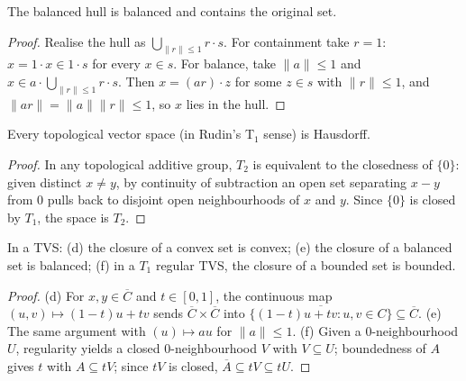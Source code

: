 \begin{theorem}
  \label{thm:balanced-hull-balanced}
  \leanok
  The balanced hull is balanced and contains the original set.
\end{theorem}
\begin{proof}
  \leanok
  Realise the hull as $\bigcup_{\|r\| \le 1} r \cdot s$. For containment
  take $r = 1$: $x = 1 \cdot x \in 1 \cdot s$ for every $x \in s$. For
  balance, take $\|a\| \le 1$ and $x \in a \cdot \bigcup_{\|r\|\le 1}
  r \cdot s$. Then $x = (a r) \cdot z$ for some $z \in s$ with
  $\|r\| \le 1$, and $\|a r\| = \|a\|\|r\| \le 1$, so $x$ lies in the
  hull.
\end{proof}

\begin{theorem}
  \label{thm:tvs-hausdorff}
  \leanok
  Every topological vector space (in Rudin's T$_1$ sense) is Hausdorff.
\end{theorem}
\begin{proof}
  \leanok
  In any topological additive group, $T_2$ is equivalent to the
  closedness of $\{0\}$: given distinct $x \neq y$, by continuity of
  subtraction an open set separating $x - y$ from $0$ pulls back to
  disjoint open neighbourhoods of $x$ and $y$. Since $\{0\}$ is closed
  by $T_1$, the space is $T_2$.
\end{proof}

\begin{theorem}
  \label{thm:closure-properties}
  \leanok
  In a TVS: (d) the closure of a convex set is convex; (e) the closure of
  a balanced set is balanced; (f) in a $T_1$ regular TVS, the closure of
  a bounded set is bounded.
\end{theorem}
\begin{proof}
  \leanok
  (d) For $x, y \in \overline{C}$ and $t \in [0, 1]$, the continuous map
  $(u, v) \mapsto (1 - t) u + t v$ sends $\overline{C} \times \overline{C}$
  into $\overline{\{(1 - t) u + t v : u, v \in C\}} \subseteq \overline{C}$.
  (e) The same argument with $(u) \mapsto a u$ for $\|a\| \le 1$.
  (f) Given a $0$-neighbourhood $U$, regularity yields a closed
  $0$-neighbourhood $V$ with $V \subseteq U$; boundedness of $A$ gives
  $t$ with $A \subseteq t V$; since $t V$ is closed, $\overline{A}
  \subseteq t V \subseteq t U$.
\end{proof}

